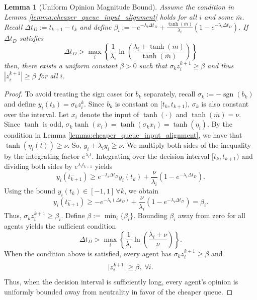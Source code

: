 \documentclass[conference]{IEEEtran}
\DeclareMathOperator{\sgn}{sgn}
\newtheorem{lemma}{Lemma}
\begin{document}
\begin{lemma}[Uniform Opinion Magnitude Bound]\label{lemma:opinion_magnitude_bound}
    Assume the condition in Lemma \ref{lemma:cheaper_queue_input_alignment} holds for all $i$ and some $\overline{m}$. 
    Recall $\Delta t_D := t_{k+1} - t_k$ and define $        \beta_i := -e^{-\lambda_i\Delta t_D} + \frac{\tanh(\overline{m})}{\lambda_i}(1 - e^{-\lambda_i\Delta t_D})$.
    If $\Delta t_D$ satisfies
    \begin{equation}
        \Delta t_D > \max_i\left\{\frac{1}{\lambda_i}\ln\left(\frac{\lambda_i + \tanh(\overline{m})}{\tanh(\overline{m})}\right)\right\}
    \end{equation}
    then, there exists a uniform constant $\beta > 0$ such that $\sigma_kz^{k+1}_i \ge \beta$ and thus $|z^{k+1}_i| \ge \beta$ for all $i$.
\end{lemma}
\begin{proof}
    To avoid treating the sign cases for $b_k$ separately, recall $\sigma_k := -\sgn(b_k)$ and define $y_i(t_k) = \sigma_kz^k_i$. Since $b_k$ is constant on $[t_k, t_{k+1})$, $\sigma_k$ is also constant over the interval.
    Let $x_i$ denote the input of $\tanh(\cdot)$ and $\tanh(\overline{m}) = \nu$. Since $\tanh$ is odd, $\sigma_k\tanh(x_i) = \tanh(\sigma_k x_i) = \tanh(\eta_i)$. By the condition in Lemma \ref{lemma:cheaper_queue_input_alignment}, we have that $\tanh(\eta_i(t)) \ge \nu$. So, $\dot{y}_i + \lambda_i y_i \ge \nu$. We multiply both sides of the inequality by the integrating factor $e^{\lambda_it}$. Integrating over the decision interval $[t_k, t_{k+1})$ and dividing both sides by $e^{\lambda_i t_{k+1}}$ yields
    \begin{equation}
        y_i(t^-_{k+1}) \ge e^{-\lambda_i\Delta t_D}y_i(t_k) + \frac{\nu}{\lambda_i}(1 - e^{-\lambda_i\Delta t_D}). 
    \end{equation}
    Using the bound $y_{i}(t_{k}) \in [-1,1] \, \forall k$, we obtain 
    \begin{equation}
        y_i(t^-_{k+1}) \ge  -e^{-\lambda_i(\Delta t_D)} + \frac{\nu}{\lambda_i}(1 - e^{-\lambda_i\Delta t_D}) = \beta_i.
    \end{equation} 
    Thus, $\sigma_kz^{k+1}_i \ge \beta_i$. 
    Define $\beta := \min_i\{\beta_i\}$. 
    Bounding $\beta_i$ away from zero for all agents yields the sufficient condition
    \begin{equation}
        \Delta t_D > \max_i \left\{\frac{1}{\lambda_i}\ln\left(\frac{\lambda_i + \nu}{\nu}\right)\right\}.
    \end{equation}
    When the condition above is satisfied, every agent has $\sigma_kz^{k+1}_i \ge \beta$ and
    \begin{equation}
        |z^{k+1}_i| \ge \beta, \hspace{0.1cm} \forall i.
    \end{equation}
    Thus, when the decision interval is sufficiently long, every agent's opinion is uniformly bounded away from neutrality in favor of the cheaper queue.
\end{proof}
\end{document}
